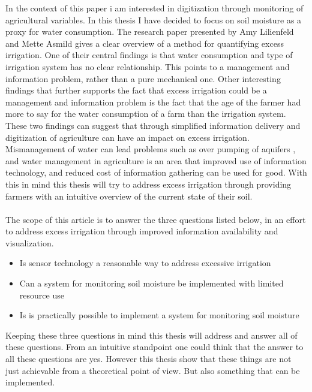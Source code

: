 \documentclass[]{uiophd}
\begin{document}
In the context of this paper i am interested in digitization through monitoring of agricultural variables. In this thesis I have decided to focus on soil moisture as a proxy for water consumption. The research paper presented by Amy Lilienfeld and Mette Asmild gives a clear overview of a method for quantifying excess irrigation. One of their central findings is that water consumption and type of irrigation system has no clear relationship. This points to a management and information problem, rather than a pure mechanical one. Other interesting findings that further supports the fact that excess irrigation could be a management and information problem is the fact that the age of the farmer had more to say for the water consumption of a farm than the irrigation system. These two findings can suggest that through simplified information delivery and digitization of agriculture can have an impact on excess irrigation. Mismanagement of water can lead problems such as over pumping of aquifers \cite{LILIENFELD200773}, and water management in agriculture is an area that improved use of information technology, and reduced cost of information gathering can be used for good. With this in mind this thesis will try to address excess irrigation through providing farmers with an intuitive overview of the current state of their soil. 
\\\\
The scope of this article is to answer the three questions listed below, in an effort to address excess irrigation through improved information availability and visualization.


\begin{itemize}
  \item Is sensor technology a reasonable way to address excessive irrigation
  \item Can a system for monitoring soil moisture be implemented with limited resource use
  \item Is is practically possible to implement a system for monitoring soil moisture 
\end{itemize}
Keeping these three questions in mind this thesis will address and answer all of these questions. From an intuitive standpoint one could think that the answer to all these questions are yes. However this thesis show that these things are not just achievable from a theoretical point of view. But also something that can be implemented.
\end{document}
